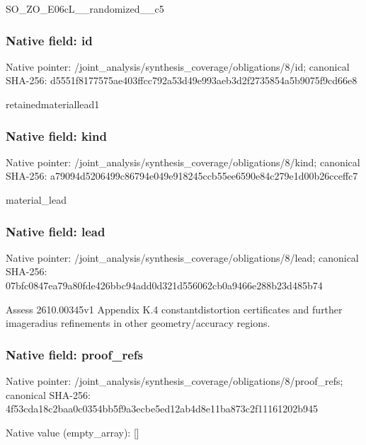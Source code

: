 \documentclass[10pt,a4paper]{article}
\begin{document}
SO\_ZO\_E06cL\_\_randomized\_\_c5


\subsubsection{Native field: id}


Native pointer: /joint\_analysis/synthesi\allowbreak{}s\_coverage/obligations/8\allowbreak{}/id; canonical SHA-256: d5551f8177575ae403ffcc79\allowbreak{}2a53d49e993aeb3d2f273585\allowbreak{}4a5b9075f9cd66e8


retainedmateriallead1


\subsubsection{Native field: kind}


Native pointer: /joint\_analysis/synthesi\allowbreak{}s\_coverage/obligations/8\allowbreak{}/kind; canonical SHA-256: a79094d5206499c86794e049\allowbreak{}e918245ccb55ee6590e84c27\allowbreak{}9e1d00b26cceffc7


material\_lead


\subsubsection{Native field: lead}


Native pointer: /joint\_analysis/synthesi\allowbreak{}s\_coverage/obligations/8\allowbreak{}/lead; canonical SHA-256: 07bfc0847ea79a80fde426bb\allowbreak{}c94add0d321d556062cb0a94\allowbreak{}66e288b23d485b74


Assess 2610.00345v1 Appendix K.4 constantdistortion certificates and further imageradius refinements in other geometry/accuracy regions.


\subsubsection{Native field: proof\_refs}


Native pointer: /joint\_analysis/synthesi\allowbreak{}s\_coverage/obligations/8\allowbreak{}/proof\_refs; canonical SHA-256: 4f53cda18c2baa0c0354bb5f\allowbreak{}9a3ecbe5ed12ab4d8e11ba87\allowbreak{}3c2f11161202b945



Native value (empty\_array): []
\end{document}

